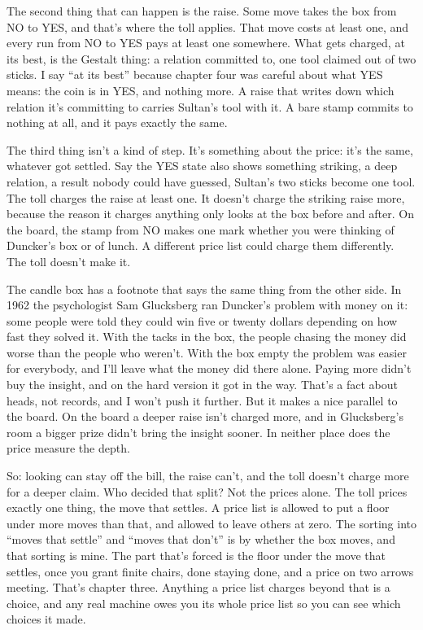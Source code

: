 \documentclass[11pt,twoside]{article}
\theoremstyle{thielethm}
\theoremstyle{thieledef}
\theoremstyle{thieledef}
\theoremstyle{thieledef}
\theoremstyle{thielethm}
\theoremstyle{thieleobs}
\theoremstyle{thielethm}
\begin{document}
The second thing that can happen is the raise. Some move takes the box from NO to YES, and that's where the toll applies. That move costs at least one, and every run from NO to YES pays at least one somewhere. What gets charged, at its best, is the Gestalt thing: a relation committed to, one tool claimed out of two sticks. I say ``at its best'' because chapter four was careful about what YES means: the coin is in YES, and nothing more. A raise that writes down which relation it's committing to carries Sultan's tool with it. A bare stamp commits to nothing at all, and it pays exactly the same.

The third thing isn't a kind of step. It's something about the price: it's the same, whatever got settled. Say the YES state also shows something striking, a deep relation, a result nobody could have guessed, Sultan's two sticks become one tool. The toll charges the raise at least one. It doesn't charge the striking raise more, because the reason it charges anything only looks at the box before and after. On the board, the stamp from NO makes one mark whether you were thinking of Duncker's box or of lunch. A different price list could charge them differently. The toll doesn't make it.

The candle box has a footnote that says the same thing from the other side. In 1962 the psychologist Sam Glucksberg ran Duncker's problem with money on it: some people were told they could win five or twenty dollars depending on how fast they solved it. With the tacks in the box, the people chasing the money did worse than the people who weren't. With the box empty the problem was easier for everybody, and I'll leave what the money did there alone. Paying more didn't buy the insight, and on the hard version it got in the way. That's a fact about heads, not records, and I won't push it further. But it makes a nice parallel to the board. On the board a deeper raise isn't charged more, and in Glucksberg's room a bigger prize didn't bring the insight sooner. In neither place does the price measure the depth.

So: looking can stay off the bill, the raise can't, and the toll doesn't charge more for a deeper claim. Who decided that split? Not the prices alone. The toll prices exactly one thing, the move that settles. A price list is allowed to put a floor under more moves than that, and allowed to leave others at zero. The sorting into ``moves that settle'' and ``moves that don't'' is by whether the box moves, and that sorting is mine. The part that's forced is the floor under the move that settles, once you grant finite chairs, done staying done, and a price on two arrows meeting. That's chapter three. Anything a price list charges beyond that is a choice, and any real machine owes you its whole price list so you can see which choices it made.
\end{document}
